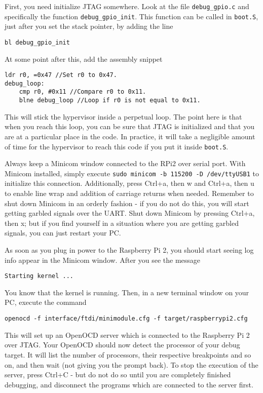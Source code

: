 \documentclass[a4paper,11pt,reqno]{amsart}
\begin{document}
First, you need initialize JTAG somewhere. Look at the file \texttt{debug_gpio.c} and specifically the function \texttt{debug_gpio_init}. This function can be called in \texttt{boot.S}, just after you set the stack pointer, by adding the line

\begin{verbatim}
bl debug_gpio_init
\end{verbatim}

At some point after this, add the assembly snippet

\begin{verbatim}
ldr r0, =0x47 //Set r0 to 0x47.
debug_loop:
	cmp r0, #0x11 //Compare r0 to 0x11.
	blne debug_loop //Loop if r0 is not equal to 0x11.
\end{verbatim}

This will stick the hypervisor inside a perpetual loop. The point here is that when you reach this loop, you can be sure that JTAG is initialized and that you are at a particular place in the code. In practice, it will take a negligible amount of time for the hypervisor to reach this code if you put it inside \texttt{boot.S}.

Always keep a Minicom window connected to the RPi2 over serial port. With Minicom installed, simply execute \texttt{sudo minicom -b 115200 -D /dev/ttyUSB1} to initialize this connection. Additionally, press Ctrl+a, then w and Ctrl+a, then u to enable line wrap and addition of carriage returns when needed. Remember to shut down Minicom in an orderly fashion - if you do not do this, you will start getting garbled signals over the UART. Shut down Minicom by pressing Ctrl+a, then x; but if you find yourself in a situation where you are getting garbled signals, you can just restart your PC.

As soon as you plug in power to the Raspberry Pi 2, you should start seeing log info appear in the Minicom window. After you see the message

\begin{verbatim}
Starting kernel ...
\end{verbatim}

You know that the kernel is running. Then, in a new terminal window on your PC, execute the command

\begin{verbatim}
openocd -f interface/ftdi/minimodule.cfg -f target/raspberrypi2.cfg
\end{verbatim}

This will set up an OpenOCD server which is connected to the Raspberry Pi 2 over JTAG. Your OpenOCD should now detect the processor of your debug target. It will list the number of processors, their respective breakpoints and so on, and then wait (not giving you the prompt back). To stop the execution of the server, press Ctrl+C - but do not do so until you are completely finished debugging, and disconnect the programs which are connected to the server first.
\end{document}

